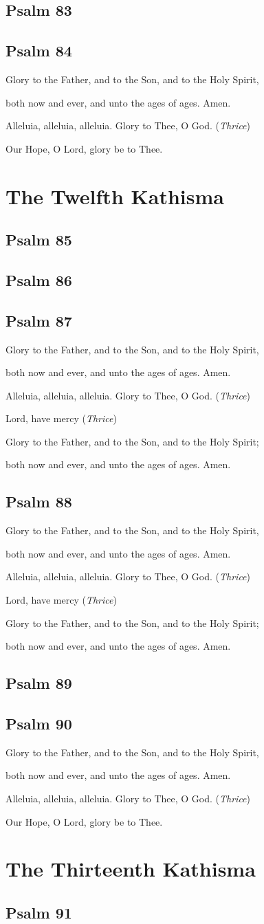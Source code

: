 \documentclass[12pt,openany]{book}
\newcommand{\kathismabreak}{
  \medskip
  \begin{center}
  \begin{footnotesize}
  Glory to the Father, and to the Son, and to the Holy Spirit,
  
  both now and ever, and unto the ages of ages. Amen.

  Alleluia, alleluia, alleluia. Glory to Thee, O God. (\textit{Thrice})

  Lord, have mercy (\textit{Thrice})

  Glory to the Father, and to the Son, and to the Holy Spirit;
  
  both now and ever, and unto the ages of ages. Amen.
  \end{footnotesize}
  \end{center}
  \smallbreak
}
\newcommand{\kathismaend}{
  \medskip
  \begin{center}
  \begin{footnotesize}
  Glory to the Father, and to the Son, and to the Holy Spirit,
  
  both now and ever, and unto the ages of ages. Amen.

  Alleluia, alleluia, alleluia. Glory to Thee, O God. (\textit{Thrice})

  Our Hope, O Lord, glory be to Thee.
  \end{footnotesize}
  \end{center}
  \smallbreak
}
\begin{document}
\section{Psalm 83}

\smallskip
\section{Psalm 84}


\pagebreak %
\kathismaend

\chapter*{The Twelfth Kathisma}
\smallskip
\section{Psalm 85}

\smallskip
\section{Psalm 86}

\smallskip
\section{Psalm 87}


\kathismabreak
\smallskip
\section{Psalm 88}


\kathismabreak
\smallskip
\section{Psalm 89}

\smallskip
\section{Psalm 90}


\kathismaend

\chapter*{The Thirteenth Kathisma}
\smallskip
\section{Psalm 91}

\smallskip
\end{document}
